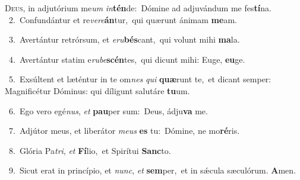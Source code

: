 \lettrine{\initial\textcolor{\initialcolor}{D}}{eus,} in adjutórium me\textit{um} \textit{in}\-\textbf{tén}de:~\star Dómine ad adjuvándum me fes\-\textbf{tí}\-na.\\
{\numbfont\textcolor{\numbcolor}{~2.}}~Confundántur et re\-\textit{ve}\-\textit{re}\textbf{án}tur,~\star qui quærunt ánimam \textbf{me}\-am.\par
{\numbfont\textcolor{\numbcolor}{~3.}}~Avertántur retrórsum, et \textit{e}\-\textit{ru}\textbf{bés}cant,~\star qui volunt mihi \textbf{ma}\-la.\par
{\numbfont\textcolor{\numbcolor}{~4.}}~Avertántur statim e\-\textit{ru}\-\textit{be}\textbf{scén}tes,~\star qui dicunt mihi: Euge, \textbf{eu}\-ge.\par
{\numbfont\textcolor{\numbcolor}{~5.}}~Exsúltent et læténtur in te om\textit{nes} \textit{qui} \textbf{quæ}\-runt te,~\star et dicant semper: Magnificétur Dóminus: qui díligunt salutáre \textbf{tu}\-um.\par
{\numbfont\textcolor{\numbcolor}{~6.}}~Ego vero egé\-\textit{nus}\-, \textit{et} \textbf{pau}\-per sum:~\star Deus, ádju\textbf{va} me.\par
{\numbfont\textcolor{\numbcolor}{~7.}}~Adjútor meus, et liberátor \textit{me}\-\textit{us} \textbf{es} tu:~\star Dómine, ne mo\-\textbf{ré}\-ris.\par
{\numbfont\textcolor{\numbcolor}{~8.}}~Glória Pa\-\textit{tri}\-, \textit{et} \textbf{Fí}\-lio,~\star et Spirítui \textbf{Sanc}\-to.\par
{\numbfont\textcolor{\numbcolor}{~9.}}~Sicut erat in princípio, et \textit{nunc}\-, \textit{et} \textbf{sem}\-per,~\star et in sǽcula sæculórum. \textbf{A}\-men.\par
